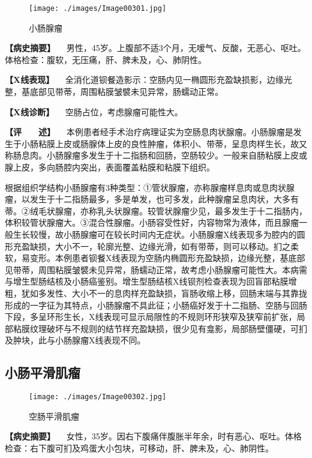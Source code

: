 \begin{figure}[!htbp]
 \centering
 \texttt{[image: ./images/Image00301.jpg]}
 \captionsetup{justification=centering}
 \caption{小肠腺瘤}
 \label{fig5-5-5}
  \end{figure} 

\textbf{【病史摘要】}
　男性，45岁。上腹部不适3个月，无嗳气、反酸，无恶心、呕吐。体格检查：腹软，无压痛，肝、脾未及，心、肺阴性。

\textbf{【X线表现】}
　全消化道钡餐造影示：空肠内见一椭圆形充盈缺损影，边缘光整，基底部见带蒂，周围粘膜皱襞未见异常，肠蠕动正常。

\textbf{【X线诊断】} 　空肠占位，考虑腺瘤可能性大。

\textbf{【评　　述】}
　本例患者经手术治疗病理证实为空肠息肉状腺瘤。小肠腺瘤是发生于小肠粘膜上皮或肠腺体上皮的良性肿瘤，体积小、带蒂，呈息肉样生长，故又称肠息肉。小肠腺瘤多发生于十二指肠和回肠，空肠较少。一般来自肠粘膜上皮或腺上皮，多向肠腔内突出，表面覆盖粘膜和粘膜下组织。

根据组织学结构小肠腺瘤有3种类型：①管状腺瘤，亦称腺瘤样息肉或息肉状腺瘤，以发生于十二指肠最多，多是单发，也可多发，此种腺瘤呈息肉状，大多有蒂。②绒毛状腺瘤，亦称乳头状腺瘤。较管状腺瘤少见，最多发生于十二指肠内，体积较管状腺瘤大。③混合性腺瘤。小肠容受性好，内容物常为液体，而且腺瘤一般生长较慢，故小肠腺瘤可在较长时间内无症状。小肠腺瘤X线表现多为腔内的圆形充盈缺损，大小不一，轮廓光整、边缘光滑，如有带蒂，则可以移动。扪之柔软，易变形。本例患者钡餐X线表现为空肠内椭圆形充盈缺损，边缘光整，基底部见带蒂，周围粘膜皱襞未见异常，肠蠕动正常，故考虑小肠腺瘤可能性大。本病需与增生型肠结核及小肠癌鉴别。增生型肠结核X线钡剂检查表现为回盲部粘膜增粗，犹如多发性、大小不一的息肉样充盈缺损，盲肠收缩上移，回肠末端与其靠拢形成的一字征为其特点，小肠腺瘤不具此征；小肠癌好发于十二指肠、空肠与回肠下段，多呈环形生长，X线表现可显示局限性的不规则环形狭窄及狭窄前扩张，局部粘膜纹理破坏与不规则的结节样充盈缺损，很少见有龛影，局部肠壁僵硬，可扪及肿块，此与小肠腺瘤X线表现不同。

\subsection{小肠平滑肌瘤}

\begin{figure}[!htbp]
 \centering
 \texttt{[image: ./images/Image00302.jpg]}
 \captionsetup{justification=centering}
 \caption{空肠平滑肌瘤}
 \label{fig5-5-6}
  \end{figure} 

\textbf{【病史摘要】}
　女性，35岁。因右下腹痛伴腹胀半年余，时有恶心、呕吐。体格检查：右下腹可扪及鸡蛋大小包块，可移动，肝、脾未及，心、肺阴性。

